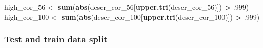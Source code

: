 \documentclass[
]{article}
\newenvironment{Shaded}{\begin{snugshade}}{\end{snugshade}}
\newcommand{\DecValTok}[1]{\textcolor[rgb]{0.00,0.00,0.81}{#1}}
\newcommand{\FloatTok}[1]{\textcolor[rgb]{0.00,0.00,0.81}{#1}}
\newcommand{\KeywordTok}[1]{\textcolor[rgb]{0.13,0.29,0.53}{\textbf{#1}}}
\newcommand{\NormalTok}[1]{#1}
\newcommand{\OperatorTok}[1]{\textcolor[rgb]{0.81,0.36,0.00}{\textbf{#1}}}
\newcommand{\StringTok}[1]{\textcolor[rgb]{0.31,0.60,0.02}{#1}}
\begin{document}
\begin{Shaded}
\begin{Highlighting}[]
\NormalTok{high_cor_}\DecValTok{56}\NormalTok{ <-}\StringTok{ }\KeywordTok{sum}\NormalTok{(}\KeywordTok{abs}\NormalTok{(descr_cor_}\DecValTok{56}\NormalTok{[}\KeywordTok{upper.tri}\NormalTok{(descr_cor_}\DecValTok{56}\NormalTok{)]) }\OperatorTok{>}\StringTok{ }\FloatTok{.999}\NormalTok{)}
\NormalTok{high_cor_}\DecValTok{100}\NormalTok{ <-}\StringTok{ }\KeywordTok{sum}\NormalTok{(}\KeywordTok{abs}\NormalTok{(descr_cor_}\DecValTok{100}\NormalTok{[}\KeywordTok{upper.tri}\NormalTok{(descr_cor_}\DecValTok{100}\NormalTok{)]) }\OperatorTok{>}\StringTok{ }\FloatTok{.999}\NormalTok{)}
\end{Highlighting}
\end{Shaded}

\hypertarget{test-and-train-data-split}{%
\subsubsection{Test and train data
split}\label{test-and-train-data-split}}

\label{show-split}
\end{document}

